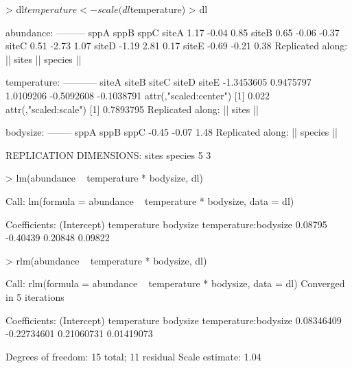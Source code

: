 \documentclass{article}
\numberwithin{exercise}{section}
\begin{document}
\newpage

\begin{Schunk}
\begin{Sinput}
> dl$temperature <- scale(dl$temperature)
> dl
\end{Sinput}
\begin{Soutput}
abundance:
---------
       sppA  sppB  sppC
siteA  1.17 -0.04  0.85
siteB  0.65 -0.06 -0.37
siteC  0.51 -2.73  1.07
siteD -1.19  2.81  0.17
siteE -0.69 -0.21  0.38
Replicated along:  || sites || species || 


temperature:
-----------
     siteA      siteB      siteC      siteD      siteE 
-1.3453605  0.9475797  1.0109206 -0.5092608 -0.1038791 
attr(,"scaled:center")
[1] 0.022
attr(,"scaled:scale")
[1] 0.7893795
Replicated along:  || sites || 


bodysize:
--------
 sppA  sppB  sppC 
-0.45 -0.07  1.48 
Replicated along:  || species || 


REPLICATION DIMENSIONS: 
  sites species 
      5       3 
\end{Soutput}
\end{Schunk}

\newpage

\begin{Schunk}
\begin{Sinput}
> lm(abundance ~ temperature * bodysize, dl)
\end{Sinput}
\begin{Soutput}
Call:
lm(formula = abundance ~ temperature * bodysize, data = dl)

Coefficients:
         (Intercept)           temperature              bodysize  temperature:bodysize  
             0.08795              -0.40439               0.20848               0.09822  
\end{Soutput}
\end{Schunk}

\newpage

\begin{Schunk}
\begin{Sinput}
> rlm(abundance ~ temperature * bodysize, dl)
\end{Sinput}
\begin{Soutput}
Call:
rlm(formula = abundance ~ temperature * bodysize, data = dl)
Converged in 5 iterations

Coefficients:
         (Intercept)          temperature             bodysize temperature:bodysize 
          0.08346409          -0.22734601           0.21060731           0.01419073 

Degrees of freedom: 15 total; 11 residual
Scale estimate: 1.04 
\end{Soutput}
\end{Schunk}
\end{document}

